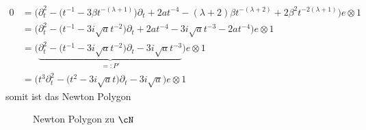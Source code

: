 \begin{try}
\begin{align*}
0 &= \Big(\partial_t^2 - \big(t^{-1} - 3\beta t^{-(\lambda+1)}\big)\partial_t
   + 2at^{-4} - (\lambda+2)\beta t^{-(\lambda+2)}
   + 2 \beta^2 t^{-2(\lambda+1)}\Big) e\otimes 1
\\&= \Big(\partial_t^2 - \big(t^{-1} - 3i\sqrt{a}
    t^{-2}\big)\partial_t
   + 2at^{-4} - 3i\sqrt{a} t^{-3}
   - 2a t^{-4}\Big) e\otimes 1
\\&= \Big( \underset{=:P'}{\underbrace{ \partial_t^2 - \big(t^{-1} - 3i\sqrt{a}
  t^{-2}\big)\partial_t - 3i\sqrt{a} t^{-3} }} \Big) e\otimes 1
\\&= \Big(t^3\partial_t^2 - \big(t^{2} - 3i\sqrt{a} t\big)\partial_t
   - 3i\sqrt{a} \Big) e\otimes 1
\end{align*}
somit ist das Newton Polygon
\begin{figure}[H]
\caption{Newton Polygon zu $\cN$}
\begin{center}
\end{center}
\end{figure}
\end{try}

